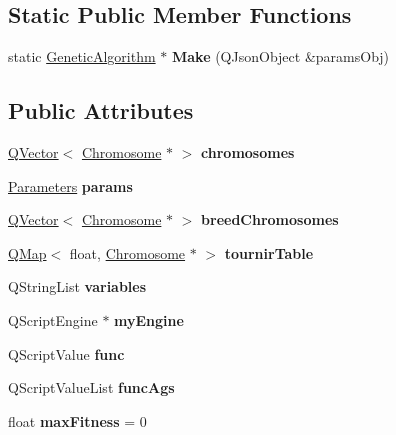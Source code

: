 \subsection*{Static Public Member Functions}
\begin{DoxyCompactItemize}
\item 
\mbox{\label{class_genetic_algorithm_a58957ce0d547dc7c634a6048ce7a33bb}} 
static \hyperlink{class_genetic_algorithm}{Genetic\+Algorithm} $\ast$ {\bfseries Make} (Q\+Json\+Object \&params\+Obj)
\end{DoxyCompactItemize}
\subsection*{Public Attributes}
\begin{DoxyCompactItemize}
\item 
\mbox{\label{class_genetic_algorithm_a51b416181ed5e839a55b245f02c430af}} 
\hyperlink{class_q_vector}{Q\+Vector}$<$ \hyperlink{class_chromosome}{Chromosome} $\ast$ $>$ {\bfseries chromosomes}
\item 
\mbox{\label{class_genetic_algorithm_a08449fb8e9c0ca13f715efc46c7c3861}} 
\hyperlink{struct_genetic_algorithm_params_1_1_parameters}{Parameters} {\bfseries params}
\item 
\mbox{\label{class_genetic_algorithm_a413c9f0712074cc8dc4794b55cdadd97}} 
\hyperlink{class_q_vector}{Q\+Vector}$<$ \hyperlink{class_chromosome}{Chromosome} $\ast$ $>$ {\bfseries breed\+Chromosomes}
\item 
\mbox{\label{class_genetic_algorithm_aeb4dc5fb05dab4240068c7bb6c29362d}} 
\hyperlink{class_q_map}{Q\+Map}$<$ float, \hyperlink{class_chromosome}{Chromosome} $\ast$ $>$ {\bfseries tournir\+Table}
\item 
\mbox{\label{class_genetic_algorithm_aa2f60ca6342c57ff7217f678d7a02819}} 
Q\+String\+List {\bfseries variables}
\item 
\mbox{\label{class_genetic_algorithm_a732eb5d24e9f796b8f708debdf7172e1}} 
Q\+Script\+Engine $\ast$ {\bfseries my\+Engine}
\item 
\mbox{\label{class_genetic_algorithm_a0c210545dc459ca999ee52783e688b53}} 
Q\+Script\+Value {\bfseries func}
\item 
\mbox{\label{class_genetic_algorithm_a744b4cccc0f9df8fdca9f573d0a5cd07}} 
Q\+Script\+Value\+List {\bfseries func\+Ags}
\item 
\mbox{\label{class_genetic_algorithm_a0af9a260dbff950b59184cde5cdc236f}} 
float {\bfseries max\+Fitness} = 0
\end{DoxyCompactItemize}


